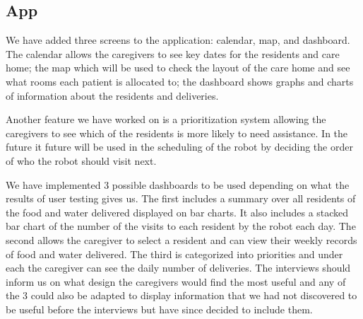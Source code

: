 \documentclass{article}
\begin{document}
\subsection{App}
\par We have added three screens to the application: calendar, map, and dashboard. The calendar allows the caregivers to see key dates for the residents and care home; the map which will be used to check the layout of the care home and see what rooms each patient is allocated to; the dashboard shows graphs and charts of information about the residents and deliveries. 
\par Another feature we have worked on is a prioritization system allowing the caregivers to see which of the residents is more likely to need assistance. In the future it future will be used in the scheduling of the robot by deciding the order of who the robot should visit next.
\par We have implemented 3 possible dashboards to be used depending on what the results of user testing gives us. The first includes a summary over all residents of the food and water delivered displayed on bar charts. It also includes a stacked bar chart of the number of the visits to each resident by the robot each day. The second allows the caregiver to select a resident and can view their weekly records of food and water delivered. The third is categorized into priorities and under each the caregiver can see the daily number of deliveries. The interviews should inform us on what design the caregivers would find the most useful and any of the 3 could also be adapted to display information that we had not discovered to be useful before the interviews but have since decided to include them.
\end{document}
